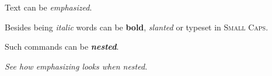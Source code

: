 \documentclass{article}
\begin{document}
{\sffamily
Text can be {\em emphasized}.

Besides being {\itshape italic} words can be {\bfseries bold},
{\slshape slanted} or typeset in {\scshape Small Caps}.

Such commands can be {\itshape\bfseries nested}.}

{\em See how {\em emphasizing} looks when nested.}
\end{document}
